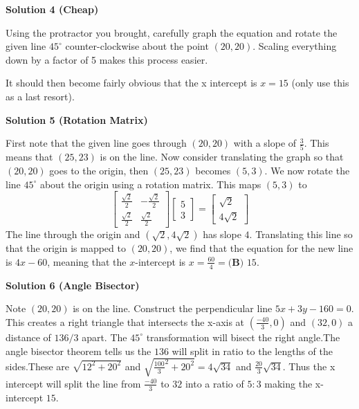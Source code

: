 \begin{enumerate}
\textbf{Solution 4 (Cheap)}

Using the protractor you brought, carefully graph the equation and rotate the given line $45^{\circ}$ counter-clockwise about the point $(20,20)$. Scaling everything down by a factor of 5 makes this process easier.

 It should then become fairly obvious that the x intercept is $x=\boxed{15}$ (only use this as a last resort). 

 



\textbf{Solution 5 (Rotation Matrix)}

First note that the given line goes through $(20,20)$ with a slope of $\frac{3}{5}$. This means that $(25,23)$ is on the line. Now consider translating the graph so that $(20,20)$ goes to the origin, then $(25,23)$ becomes $(5,3)$. We now rotate the line $45^\circ$ about the origin using a rotation matrix. This maps $(5,3)$ to 
 \[\begin{bmatrix} \frac{\sqrt{2}}{2} & -\frac{\sqrt{2}}{2} \\ \frac{\sqrt{2}}{2} & \frac{\sqrt{2}}{2}\end{bmatrix}\begin{bmatrix} 5 \\ 3\end{bmatrix}=\begin{bmatrix}\sqrt{2} \\ 4\sqrt{2}\end{bmatrix}\]The line through the origin and $(\sqrt{2}, 4\sqrt{2})$ has slope $4$. Translating this line so that the origin is mapped to $(20,20)$, we find that the equation for the new line is $4x-60$, meaning that the $x$-intercept is $x=\frac{60}{4}=\boxed{\textbf{(B) }15}$.

 



\textbf{Solution 6 (Angle Bisector)}

Note $(20,20)$ is on the line.  Construct the perpendicular line $5x+3y-160=0$.  This creates a right triangle that intersects the x-axis at $(\frac{-40}{3},0)$ and $(32,0)$ a distance of $136/3$ apart.  The $45^\circ$ transformation will bisect the right angle.The angle bisector theorem tells us the $136$ will split in ratio to the lengths of the sides.These are $\sqrt{12^2+20^2}$ and $\sqrt{\frac{100}{3}^2 + 20^2} = 4\sqrt{34}$ and $\frac{20}{3}\sqrt{34}$.  Thus the x intercept will split the line from $\frac{-40}{3}$ to $32$ into a ratio of $5:3$ making the x-intercept $15$.


\end{enumerate}
